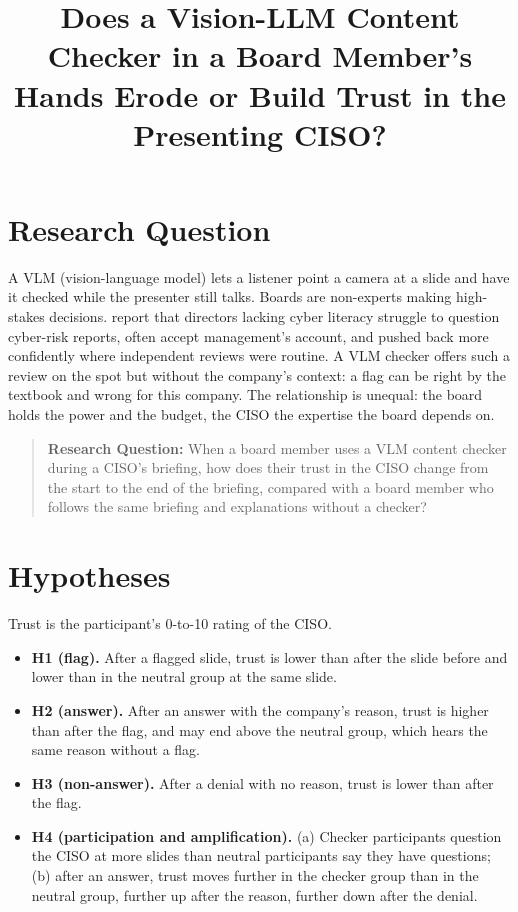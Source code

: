 \documentclass[stu, 12pt]{apa7}
\title{Does a Vision-LLM Content Checker in a Board Member's Hands Erode or Build Trust in the Presenting CISO?}
\begin{document}
\maketitle

\section{Research Question}

A VLM (vision-language model) lets a listener point a camera at a slide and have it checked while the presenter still talks. Boards are non-experts making high-stakes decisions. \textcite{aamir2026} report that directors lacking cyber literacy struggle to question cyber-risk reports, often accept management's account, and pushed back more confidently where independent reviews were routine. A VLM checker offers such a review on the spot but without the company's context: a flag can be right by the textbook and wrong for this company. The relationship is unequal: the board holds the power and the budget, the CISO the expertise the board depends on.

\begin{quote}
\textbf{Research Question:} When a board member uses a VLM content checker during a CISO's briefing, how does their trust in the CISO change from the start to the end of the briefing, compared with a board member who follows the same briefing and explanations without a checker?
\end{quote}

\section{Hypotheses}

Trust is the participant's 0-to-10 rating of the CISO.

\begin{itemize}
  \item \textbf{H1 (flag).} After a flagged slide, trust is lower than after the slide before and lower than in the neutral group at the same slide.
  \item \textbf{H2 (answer).} After an answer with the company's reason, trust is higher than after the flag, and may end above the neutral group, which hears the same reason without a flag.
  \item \textbf{H3 (non-answer).} After a denial with no reason, trust is lower than after the flag.
  \item \textbf{H4 (participation and amplification).} (a) Checker participants question the CISO at more slides than neutral participants say they have questions; (b) after an answer, trust moves further in the checker group than in the neutral group, further up after the reason, further down after the denial.
\end{itemize}
\end{document}
